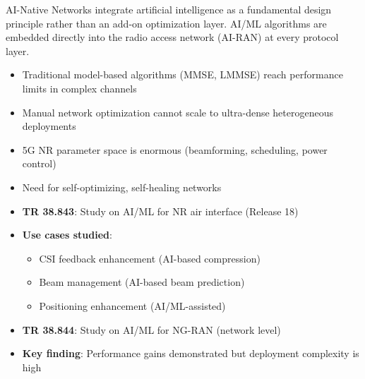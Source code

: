 

\CNchained{}

\CNchained{}

AI-Native Networks integrate artificial intelligence as a fundamental design principle rather than an add-on optimization layer. AI/\allowbreak{}ML algorithms are embedded directly into the radio access network (AI-RAN) at every protocol layer.


\begin{itemize}
\tightlist
\item
  Traditional model-based algorithms (MMSE, LMMSE) reach performance limits in complex channels
\item
  Manual network optimization cannot scale to ultra-dense heterogeneous deployments
\item
  5G NR parameter space is enormous (beamforming, scheduling, power control)
\item
  Need for self-optimizing, self-healing networks
\end{itemize}





\begin{itemize}
\tightlist
\item
  \textbf{TR 38.843}: Study on AI/\allowbreak{}ML for NR air interface (Release 18)
\item
  \textbf{Use cases studied}:

  \begin{itemize}
  \tightlist
  \item
    CSI feedback enhancement (AI-based compression)
  \item
    Beam management (AI-based beam prediction)
  \item
    Positioning enhancement (AI/\allowbreak{}ML-assisted)
  \end{itemize}
\item
  \textbf{TR 38.844}: Study on AI/\allowbreak{}ML for NG-RAN (network level)
\item
  \textbf{Key finding}: Performance gains demonstrated but deployment complexity is high
\end{itemize}

